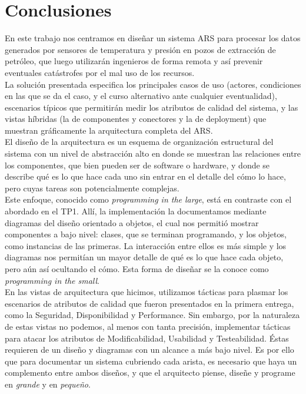 \section{Conclusiones}

En este trabajo nos centramos en diseñar un sistema ARS para procesar los datos generados por sensores de temperatura y presión en pozos de extracción de petróleo, que luego utilizarán ingenieros de forma remota y así prevenir eventuales catástrofes por el mal uso de los recursos. \\

La solución presentada especifica los principales casos de uso (actores, condiciones en las que se da el caso, y el curso alternativo ante cualquier eventualidad), escenarios típicos que permitirán medir los atributos de calidad del sistema, y las vistas híbridas (la de componentes y conectores y la de deployment) que muestran gráficamente la arquitectura completa del ARS. \\

El diseño de la arquitectura es un esquema de organización estructural del sistema con un nivel de abstracción alto en donde se muestran las relaciones entre los componentes, que bien pueden ser de software o hardware, y donde se describe qué es lo que hace cada uno sin entrar en el detalle del cómo lo hace, pero cuyas tareas son potencialmente complejas. \\

Este enfoque, conocido como \textit{programming in the large}, está en contraste con el abordado en el TP1. Allí, la implementación la documentamos mediante diagramas del diseño orientado a objetos, el cual nos permitió mostrar componentes a bajo nivel: clases, que se terminan programando, y los objetos, como instancias de las primeras. La interacción entre ellos es más simple y los diagramas nos permitían un mayor detalle de qué es lo que hace cada objeto, pero aún así ocultando el cómo. Esta forma de diseñar se la conoce como \textit{programming in the small}. \\

En las vistas de arquitectura que hicimos, utilizamos tácticas para plasmar los escenarios de atributos de calidad que fueron presentados en la primera entrega, como la Seguridad, Disponibilidad y Performance. Sin embargo, por la naturaleza de estas vistas no podemos, al menos con tanta precisión, implementar tácticas para atacar los atributos de Modificabilidad, Usabilidad y Testeabilidad. Éstas requieren de un diseño y diagramas con un alcance a más bajo nivel. Es por ello que para documentar un sistema cubriendo cada arista, es necesario que haya un complemento entre ambos diseños, y que el arquitecto piense, diseñe y programe en \textit{grande} y en \textit{pequeño}. 